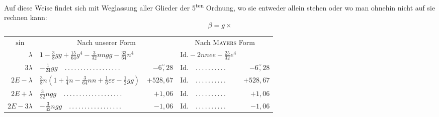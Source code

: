 \par\noindent\hspace*{\parindent}Auf diese Weise findet sich mit Weglassung aller Glieder der 5\textsuperscript{ten}
Ordnung, wo sie entweder allein stehen oder wo man ohnehin nicht auf sie
rechnen kann:
\[
\beta=g\times
\]
\begin{landscape}
\begingroup\small
\setlength{\tabcolsep}{3pt}
\renewcommand{\arraystretch}{1.15}
\begin{longtable}{r|p{7.8cm}r@{\quad}p{4.3cm}r}
\multicolumn{1}{c}{\(\sin\)}&\multicolumn{2}{c}{Nach unserer Form}&
\multicolumn{2}{c}{Nach \textsc{Mayers} Form}\\
\(\lambda\)&\(1-\tfrac38gg+\tfrac{15}{64}g^4-\tfrac{3}{32}nngg-\tfrac{33}{64}n^4\)&
&\(\text{Id.}-2nnee+\tfrac{25}{32}e^4\)&\\
\(3\lambda\)&\(-\tfrac{1}{24}gg\quad \mathord{.}\,\mathord{.}\,\mathord{.}\,\mathord{.}\,\mathord{.}\,\mathord{.}\,\mathord{.}\,\mathord{.}\,\mathord{.}\,\mathord{.}\,\mathord{.}\,\mathord{.}\,\mathord{.}\,\mathord{.}\,\mathord{.}\,\mathord{.}\,\mathord{.}\,\mathord{.}\)&\(-6\overset{\prime\prime}{,}28\)
&\(\text{Id.}\quad \mathord{.}\,\mathord{.}\,\mathord{.}\,\mathord{.}\,\mathord{.}\,\mathord{.}\,\mathord{.}\,\mathord{.}\,\mathord{.}\,\mathord{.}\)&\(-6\overset{\prime\prime}{,}28\)\\
\(2E-\lambda\)&\(\tfrac38n(1+\tfrac14n-\tfrac{3}{64}nn+\tfrac16\varepsilon\varepsilon-\tfrac12gg)\)&\(+528{,}67\)
&\(\text{Id.}\quad \mathord{.}\,\mathord{.}\,\mathord{.}\,\mathord{.}\,\mathord{.}\,\mathord{.}\,\mathord{.}\,\mathord{.}\,\mathord{.}\,\mathord{.}\)&\(+528{,}67\)\\
\(2E+\lambda\)&\(\tfrac{3}{32}ngg\quad \mathord{.}\,\mathord{.}\,\mathord{.}\,\mathord{.}\,\mathord{.}\,\mathord{.}\,\mathord{.}\,\mathord{.}\,\mathord{.}\,\mathord{.}\,\mathord{.}\,\mathord{.}\,\mathord{.}\,\mathord{.}\,\mathord{.}\,\mathord{.}\,\mathord{.}\,\mathord{.}\,\mathord{.}\)&\(+1{,}06\)
&\(\text{Id.}\quad \mathord{.}\,\mathord{.}\,\mathord{.}\,\mathord{.}\,\mathord{.}\,\mathord{.}\,\mathord{.}\,\mathord{.}\,\mathord{.}\,\mathord{.}\)&\(+1{,}06\)\\
\(2E-3\lambda\)&\(-\tfrac{3}{32}ngg\quad \mathord{.}\,\mathord{.}\,\mathord{.}\,\mathord{.}\,\mathord{.}\,\mathord{.}\,\mathord{.}\,\mathord{.}\,\mathord{.}\,\mathord{.}\,\mathord{.}\,\mathord{.}\,\mathord{.}\,\mathord{.}\,\mathord{.}\,\mathord{.}\,\mathord{.}\)&\(-1{,}06\)
&\(\text{Id.}\quad \mathord{.}\,\mathord{.}\,\mathord{.}\,\mathord{.}\,\mathord{.}\,\mathord{.}\,\mathord{.}\,\mathord{.}\,\mathord{.}\,\mathord{.}\)&\(-1{,}06\)\\

\end{longtable}
\end{landscape}
